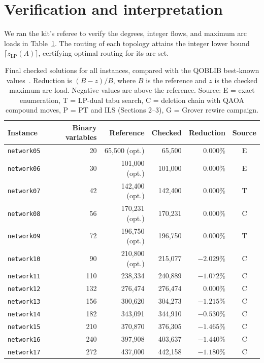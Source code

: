 \documentclass[a4paper]{article}
\begin{document}
\clearpage
\section{Verification and interpretation}

We ran the kit's referee to verify the degrees, integer flows, and maximum arc loads in Table~\ref{tab:benchmark}.
The routing of each topology attains the integer lower bound \(\lceil z_{\mathrm{LP}}(A)\rceil\), certifying optimal
routing for its arc set.

\begin{table}[htbp]
\centering
\caption{Final checked solutions for all instances, compared with the QOBLIB best-known values~\cite{qoblib}.
Reduction is \((B-z)/B\), where \(B\) is the reference and \(z\) is the checked maximum arc load. Negative values are above the reference.
Source: E = exact enumeration, T = LP-dual tabu search, C = deletion chain with QAOA compound moves,
P = PT and ILS (Sections 2--3), G = Grover rewire campaign.}
\label{tab:benchmark}
\begin{tabular}{@{}lrrrrc@{}}
\toprule
Instance & Binary variables & Reference & Checked & Reduction & Source \\
\midrule
\texttt{network05} & 20 & 65,500 (opt.) & 65,500 & 0.000\% & E \\
\texttt{network06} & 30 & 101,000 (opt.) & 101,000 & 0.000\% & E \\
\texttt{network07} & 42 & 142,400 (opt.) & 142,400 & 0.000\% & T \\
\texttt{network08} & 56 & 170,231 (opt.) & 170,231 & 0.000\% & C \\
\texttt{network09} & 72 & 196,750 (opt.) & 196,750 & 0.000\% & T \\
\texttt{network10} & 90 & 210,800 (opt.) & 215,077 & \(-2.029\)\% & C \\
\texttt{network11} & 110 & 238,334 & 240,889 & \(-1.072\)\% & C \\
\texttt{network12} & 132 & 276,474 & 276,474 & 0.000\% & C \\
\texttt{network13} & 156 & 300,620 & 304,273 & \(-1.215\)\% & C \\
\texttt{network14} & 182 & 343,091 & 344,910 & \(-0.530\)\% & C \\
\texttt{network15} & 210 & 370,870 & 376,305 & \(-1.465\)\% & C \\
\texttt{network16} & 240 & 397,908 & 403,637 & \(-1.440\)\% & C \\
\texttt{network17} & 272 & 437,000 & 442,158 & \(-1.180\)\% & C \\

\end{tabular}
\end{table}
\end{document}
